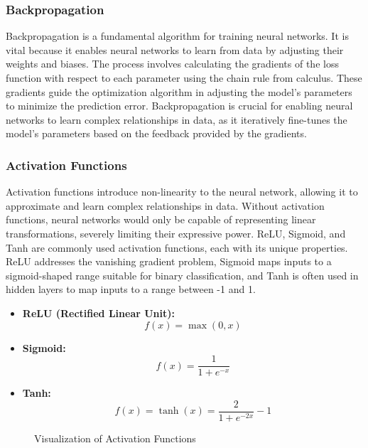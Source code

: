 \subsubsection*{Backpropagation}

Backpropagation is a fundamental algorithm for training neural networks. It is vital because it enables neural networks to learn from data by adjusting their weights and biases. The process involves calculating the gradients of the loss function with respect to each parameter using the chain rule from calculus. These gradients guide the optimization algorithm in adjusting the model's parameters to minimize the prediction error. Backpropagation is crucial for enabling neural networks to learn complex relationships in data, as it iteratively fine-tunes the model's parameters based on the feedback provided by the gradients.

\subsubsection*{Activation Functions}

Activation functions introduce non-linearity to the neural network, allowing it to approximate and learn complex relationships in data. Without activation functions, neural networks would only be capable of representing linear transformations, severely limiting their expressive power. ReLU, Sigmoid, and Tanh are commonly used activation functions, each with its unique properties. ReLU addresses the vanishing gradient problem, Sigmoid maps inputs to a sigmoid-shaped range suitable for binary classification, and Tanh is often used in hidden layers to map inputs to a range between -1 and 1.
\begin{itemize}
    \item \textbf{ReLU (Rectified Linear Unit):} 
    \[ f(x) = \max(0, x) \]
    
    \item \textbf{Sigmoid:} 
    \[ f(x) = \frac{1}{1 + e^{-x}} \]
    
    \item \textbf{Tanh:} 
    \[ f(x) = \tanh(x) = \frac{2}{1 + e^{-2x}} - 1 \]
\end{itemize}

\begin{figure}[h]
\centering
{}
\caption{Visualization of Activation Functions}
\end{figure}

